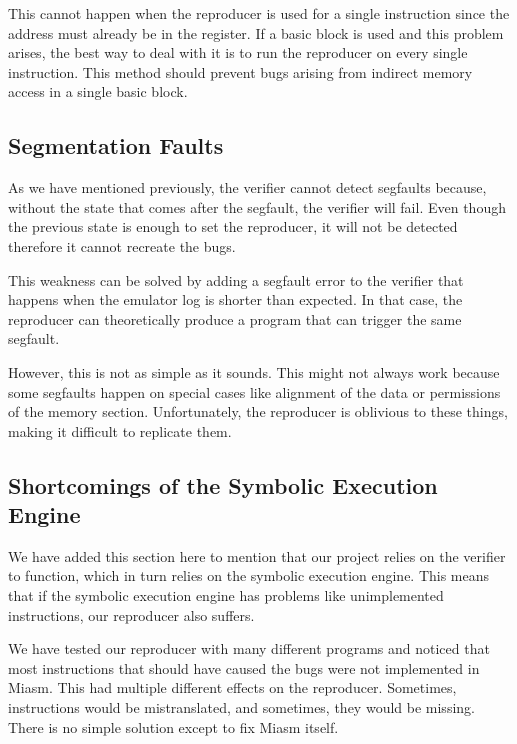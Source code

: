 This cannot happen when the reproducer is used for a single instruction since the address must already be in the register.
If a basic block is used and this problem arises, the best way to deal with it is to run the reproducer on every single instruction.
This method should prevent bugs arising from indirect memory access in a single basic block. 

\subsection{Segmentation Faults}
As we have mentioned previously, the verifier cannot detect \ac{segfault}s because, without the state that comes after the \ac{segfault}, the verifier will fail.
Even though the previous state is enough to set the reproducer, it will not be detected therefore it cannot recreate the bugs.

This weakness can be solved by adding a \ac{segfault} error to the verifier that happens when the emulator log is shorter than expected.
In that case, the reproducer can theoretically produce a program that can trigger the same \ac{segfault}.

However, this is not as simple as it sounds.
This might not always work because some \ac{segfault}s happen on special cases like alignment of the data or permissions of the memory section.
Unfortunately, the reproducer is oblivious to these things, making it difficult to replicate them.

\subsection{Shortcomings of the Symbolic Execution Engine}
We have added this section here to mention that our project relies on the verifier to function, which in turn relies on the symbolic execution engine.
This means that if the symbolic execution engine has problems like unimplemented instructions, our reproducer also suffers.

We have tested our reproducer with many different programs and noticed that most instructions that should have caused the bugs were not implemented in Miasm.
This had multiple different effects on the reproducer.
Sometimes, instructions would be mistranslated, and sometimes, they would be missing.
There is no simple solution except to fix Miasm itself.

